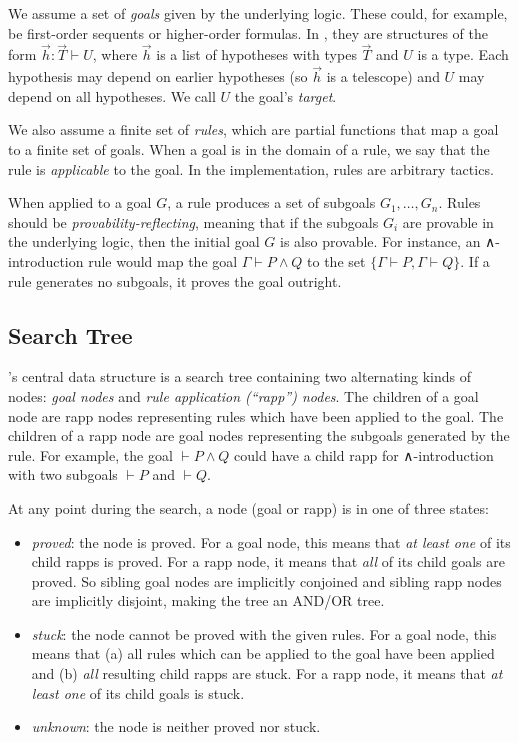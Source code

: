We assume a set of \emph{goals} given by the underlying logic. These could, for
example, be first-order sequents or higher-order formulas. In \Lean, they are
structures of the form $\vec{h} : \vec{T} ⊢ U$, where $\vec{h}$ is a list of
hypotheses with types $\vec{T}$ and $U$ is a type. Each hypothesis may depend on
earlier hypotheses (so $\vec{h}$ is a telescope) and $U$ may depend on all
hypotheses. We call $U$ the goal's \emph{target}.

We also assume a finite set of \emph{rules}, which are partial functions that
map a goal to a finite set of goals. When a goal is in the domain of a rule, we
say that the rule is \emph{applicable} to the goal. In the \Aesop{}
implementation, rules are arbitrary tactics.

When applied to a goal $G$, a rule produces a set of subgoals
$G_{1},\dots,G_{n}$. Rules should be \emph{provability-reflecting}, meaning that
if the subgoals $G_{i}$ are provable in the underlying logic, then the initial
goal $G$ is also provable. For instance, an ∧-introduction rule would map the
goal $Γ ⊢ P ∧ Q$ to the set $\{Γ ⊢ P, Γ ⊢ Q\}$. If a rule
generates no subgoals, it proves the goal outright.


\subsection{Search Tree}%
\label{sec:search-tree}

\Aesop's central data structure is a search tree containing two alternating
kinds of nodes: \emph{goal nodes} and \emph{rule application (\enquote{rapp})
  nodes}. The children of a goal node are rapp nodes representing rules which
have been applied to the goal. The children of a rapp node are goal nodes
representing the subgoals generated by the rule. For example, the goal $⊢ P ∧ Q$
could have a child rapp for ∧-introduction with two subgoals $⊢ P$ and $⊢ Q$.

At any point during the search, a node (goal or rapp) is in one of three states:
\begin{itemize}
  \item \emph{proved}: the node is proved. For a goal node, this means that
        \emph{at least one} of its child rapps is proved. For a rapp node, it
        means that \emph{all} of its child goals are proved. So sibling goal
        nodes are implicitly conjoined and sibling rapp nodes are implicitly
        disjoint, making the tree an AND/OR tree.
  \item \emph{stuck}: the node cannot be proved with the given rules. For a goal
        node, this means that (a) all rules which can be applied to the goal
        have been applied and (b) \emph{all} resulting child rapps are stuck.
        For a rapp node, it means that \emph{at least one} of its child goals is
        stuck.
  \item \emph{unknown}: the node is neither proved nor stuck.
\end{itemize}

